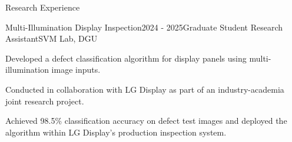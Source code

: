 \begin{rSection}{Research Experience}

\begin{rSubsection}{Multi-Illumination Display Inspection}{2024 - 2025}{Graduate Student Research Assistant}{SVM Lab, DGU}
  \item Developed a defect classification algorithm for display panels using multi-illumination image inputs.
  \item Conducted in collaboration with LG Display as part of an industry-academia joint research project.
  \item Achieved 98.5\% classification accuracy on defect test images and deployed the algorithm within LG Display’s production inspection system.
\end{rSubsection}

\end{rSection}

